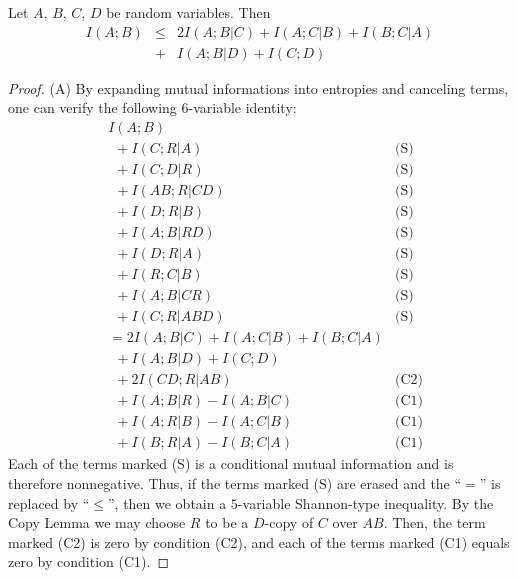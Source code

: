 \documentclass[10pt,journal]{IEEEtran}
\begin{document}
\begin{theorem}\label{th:ZY2}
Let $A$, $B$, $C$, $D$ be random variables.  Then
\begin{eqnarray*}
I(A;B) &\leq& 2I(A;B|C) + I(A;C|B) + I(B;C|A)\\
&+&I(A;B|D)+I(C;D)
\end{eqnarray*}

\end{theorem}
\begin{proof}(A)
By expanding mutual informations into entropies and canceling terms,
one can verify the following $6$-variable identity:
%
\begin{align*}
      & I(A;B)  & \\
       &\ \ + I(C;R|A)   &    \text{(S)} \\
       &\ \ + I(C;D|R)     & \text{(S)}  \\
       &\ \ + I(AB;R|CD)      &   \text{(S)}  \\
       &\ \ + I(D;R|B)       &    \text{(S)}  \\
       &\ \ + I(A;B|RD)     &  \text{(S)}  \\
       &\ \ + I(D;R|A)     &    \text{(S)}  \\
       &\ \ + I(R;C|B)     & \text{(S)}  \\
      &\ \  + I(A;B|CR)     &  \text{(S)}  \\
       &\ \  + I(C;R|ABD)     &  \text{(S)}  \\
   &= 2I(A;B|C)+I(A;C|B)+I(B;C|A)   \\
   &\ \ +I(A;B|D)+I(C;D)\\
       &\ \ + 2I(CD;R|AB)      &    \text{(C2)}  \\
      &\ \ + I(A;B|R)-I(A;B|C)      &  \text{(C1)}  \\
       &\ \ + I(A;R|B)-I(A;C|B)      &   \text{(C1)}  \\
       &\ \ + I(B;R|A)-I(B;C|A)     &  \text{(C1)}
\end{align*}
%
Each of the terms marked (S)
is a conditional mutual information and is therefore nonnegative.
Thus, if the terms marked (S) are erased and the ``$=$'' is replaced by ``$\le$'',
then we obtain a $5$-variable Shannon-type inequality.
By the Copy Lemma we may choose
$R$ to be a $D$-copy of $C$ over $AB$.
Then, the term marked (C2) is zero by condition (C2),
and each of the terms marked (C1) equals zero by condition (C1).
%
\end{proof}
\end{document}
